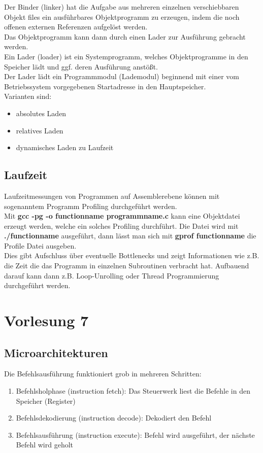 \documentclass[a4paper,12pt,leqno]{article}
\begin{document}
Der Binder (linker) hat die Aufgabe aus mehreren einzelnen verschiebbaren Objekt files ein ausführbares Objektprogramm zu erzeugen, indem die noch offenen externen Referenzen aufgelöst werden.\\
Das Objektprogramm kann dann durch einen Lader zur Ausführung gebracht werden.\\
Ein Lader (loader) ist ein Systemprogramm, welches Objektprogramme in den Speicher lädt und ggf. deren Ausführung anstößt.\\
Der Lader lädt ein Programmmodul (Lademodul) beginnend mit einer vom Betriebssystem vorgegebenen Startadresse in den Hauptspeicher.\\
Varianten sind:
\begin{itemize}
\item absolutes Laden
\item relatives Laden
\item dynamisches Laden zu Laufzeit
\end{itemize}

\subsection{Laufzeit}

Laufzeitmessungen von Programmen auf Assemblerebene können mit sogenanntem Programm Profiling durchgeführt werden.\\
Mit \textbf{gcc -pg -o functionname programmname.c} kann eine Objektdatei erzeugt werden, welche ein solches Profiling durchführt. Die Datei wird mit \textbf{./functionname} ausgeführt, dann lässt man sich mit \textbf{gprof functionname} die Profile Datei ausgeben.\\
Dies gibt Aufschluss über eventuelle Bottlenecks und zeigt Informationen wie z.B. die Zeit die das Programm in einzelnen Subroutinen verbracht hat. Aufbauend darauf kann dann z.B. Loop-Unrolling oder Thread Programmierung durchgeführt werden.

\section{Vorlesung 7}
\subsection{Microarchitekturen}
Die Befehlsausführung funktioniert grob in mehreren Schritten:
\begin{enumerate}
\item Befehlsholphase (instruction fetch): Das Steuerwerk liest die Befehle in den Speicher (Register)
\item Befehlsdekodierung (instruction decode): Dekodiert den Befehl
\item Befehlsausführung (instruction execute): Befehl wird ausgeführt, der nächste Befehl wird geholt
\end{enumerate}
\end{document}
